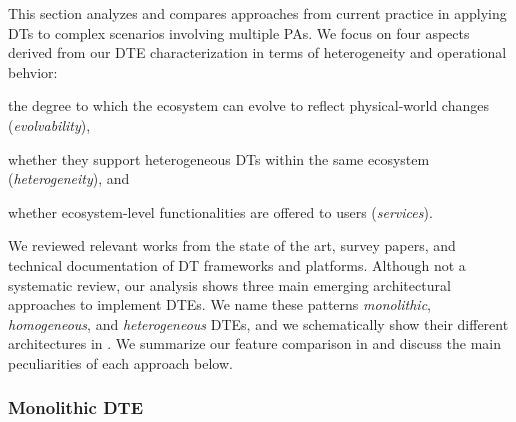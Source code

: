 This section analyzes and compares approaches from current practice in applying \acp{DT} to complex scenarios involving multiple \acp{PA}.
We focus on four aspects derived from our \ac{DTE} characterization in terms of heterogeneity and operational behvior:
\begin{inlinelist}
\item the degree to which the ecosystem can evolve to reflect physical-world changes (\emph{evolvability}),
\item whether they support heterogeneous \acp{DT} within the same ecosystem (\emph{heterogeneity}),
and 
\item whether ecosystem-level functionalities are offered to users (\emph{services}).
\end{inlinelist}

We reviewed relevant works from the state of the art, survey papers, and technical documentation of \ac{DT} frameworks and platforms.
Although not a systematic review, our analysis shows three main emerging architectural approaches to implement \acp{DTE}.
%
We name these patterns \emph{monolithic}, \emph{homogeneous}, and \emph{heterogeneous} \acp{DTE}, and we schematically show their different architectures in .
We summarize our feature comparison in  and discuss the main peculiarities of each approach below.



\subsubsection{Monolithic \acl{DTE}}
\label{sssec:monolithic}

